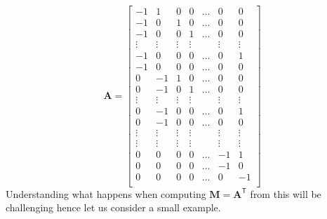 \documentclass{article}
\begin{document}
\begin{equation*}
\mathbf{A} = 
\begin{bmatrix}
    -1& 1 & 0 & 0 & \dots & 0 & 0\\
    -1 & 0 & 1 & 0 & \dots & 0 & 0\\
    -1 & 0 & 0 & 1 & \dots & 0 & 0\\
    \vdots & \vdots & \vdots & \vdots & & \vdots & \vdots \\
    -1 & 0 & 0 & 0 & \dots & 0 & 1\\
    -1 & 0 & 0 & 0 & \dots & 0 & 0\\
    0 & -1 &  1 & 0 & \dots & 0 & 0 \\
    0 & -1 & 0 & 1 & \dots & 0 & 0\\
    \vdots & \vdots & \vdots & \vdots & & \vdots & \vdots\\
    0 & -1 & 0 & 0 & \dots & 0 & 1\\
    0 &-1 & 0 & 0 & \dots & 0 & 0\\
    \vdots & \vdots & \vdots & \vdots & & \vdots& \vdots \\
    \vdots & \vdots & \vdots & \vdots & & \vdots& \vdots \\
    0 & 0 & 0 & 0 & \dots & -1 & 1\\
    0 & 0 & 0 & 0 & \dots  &-1& 0 \\
    0 & 0 & 0 & 0 & \dots & 0 &-1 \\
    \end{bmatrix}
\end{equation*}
Understanding what happens when computing $\mathbf{M} = \mathbf{A}^{\mathsf{T}}$ from this will be challenging hence let us consider a small example.
\end{document}
